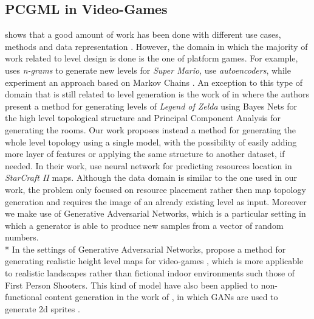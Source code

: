 \subsection{PCGML in Video-Games} 
\citeauthor{PCGML} shows that a good amount of work has been done with different use cases, methods and data representation \cite{PCGML}. However, the domain in which the majority of work related to level design is done is the one of platform games. For example, \citeauthor{mariongrams} \cite{mariongrams} uses \textit{n-grams} to generate new levels for \textit{Super Mario}\cite{game:supermario}, \citeauthor{levelsautoencoder} use \textit{autoencoders}, while \citeauthor{mariomarkovchains} experiment an approach based on Markov Chains \cite{mariomarkovchains}. 
An exception to this type of domain that is still related to level generation is the work of \citeauthor{zeldalevels} in \cite{zeldalevels} where the authors present a method for generating levels of \textit{Legend of Zelda}\cite{game:zelda} using Bayes Nets for the high level topological structure and Principal Component Analysis for generating the rooms. Our work proposes instead a method for generating the whole level topology using a single model, with the possibility of easily adding more layer of features or applying the same structure to another dataset, if needed. \newline
In their work, \citeauthor{resourcelocation} \cite{resourcelocation} use neural network for predicting resources location in \textit{StarCraft II}\cite{game:starcraft} maps. Although the data domain is similar to the one used in our work, the problem only focused on resource placement rather then map topology generation and requires the image of an already existing level as input. Moreover we make use of Generative Adversarial Networks, which is a particular setting in which a generator is able to produce new samples from a vector of random numbers. \\* 
In the settings of Generative Adversarial Networks, \citeauthor{heightgen} propose a method for generating realistic height level maps for video-games \cite{heightgen}, which is more applicable to realistic landscapes rather than fictional indoor environments such those of First Person Shooters. This kind of model have also been applied to non-functional content generation in the work of \citeauthor{spritegen}, in which GANs are used to generate 2d sprites \cite{spritegen}.
 

